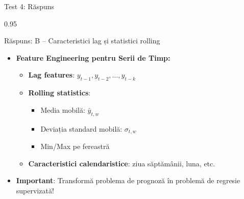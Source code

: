 \documentclass[9pt, aspectratio=169, t]{beamer}
\begin{document}
\begin{frame}{Test 4: Răspuns}
    \begin{cminipage}{0.95\textwidth}
    \begin{exampleblock}{Răspuns: B -- Caracteristici lag și statistici rolling}
        \begin{itemize}\setlength{\itemsep}{0pt}
            \item \textbf{Feature Engineering pentru Serii de Timp:}
            \begin{itemize}\setlength{\itemsep}{0pt}
                \item \textbf{Lag features}: $y_{t-1}, y_{t-2}, \ldots, y_{t-k}$
                \item \textbf{Rolling statistics}:
                    \begin{itemize}\setlength{\itemsep}{0pt}
                        \item Media mobilă: $\bar{y}_{t,w}$
                        \item Deviația standard mobilă: $\sigma_{t,w}$
                        \item Min/Max pe fereastră
                    \end{itemize}
                \item \textbf{Caracteristici calendaristice}: ziua săptămânii, luna, etc.
            \end{itemize}
            \item \textbf{Important}: Transformă problema de prognoză în problemă de regresie supervizată!
        \end{itemize}
    \end{exampleblock}
    \end{cminipage}
\end{frame}
\end{document}
